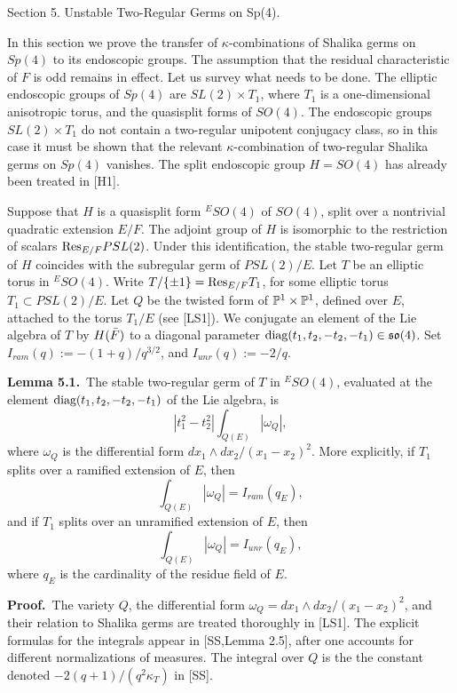 \vfill\break
\centerline{\headfont Section 5.  Unstable Two-Regular Germs on Sp(4).}
\bigskip

In this section we prove the transfer of $\kappa$-combinations
of Shalika germs on $Sp(4)$ to its endoscopic groups.
The assumption that the residual characteristic of $F$
is odd remains in effect.  Let
us survey what needs to be done.  The elliptic
endoscopic groups of $Sp(4)$ are $SL(2)\times T_1$, where
$T_1$ is a one-dimensional anisotropic torus, and the
quasisplit forms of $SO(4)$.  The endoscopic groups
$SL(2)\times T_1$ do not contain a two-regular unipotent
conjugacy class, so in this case it must be shown that
the relevant $\kappa$-combination of two-regular Shalika
germs on $Sp(4)$ vanishes.  The split endoscopic group
$H=SO(4)$ has already been treated in [H1].  

Suppose that
$H$ is a quasisplit form ${}^ESO(4)$ of $SO(4)$, split over
a nontrivial quadratic extension $E/F$.  The adjoint group
of $H$ is isomorphic to the restriction of scalars
$\hbox{Res}_{E/F}PSL(2)$.  Under this identification,
the stable two-regular germ
of $H$ coincides with the subregular germ of
$PSL(2)/E$.
Let $T$ be an elliptic torus in ${}^ESO(4)$.
Write $T/\{\pm1\} = \hbox{Res}_{E/F} T_1$, for some
elliptic torus $T_1\subset PSL(2)/E$.  Let $Q$ be the twisted form
of $\P^1\times \P^1$, defined over $E$, attached to the
torus $T_1/E$ (see [LS1]).  We conjugate an element of the
Lie algebra of $T$ by $H(\bF)$ to a diagonal parameter
$\diag(t_1,t_2,-t_2,-t_1)\in \so(4)$.
Set $I_{ram}(q):= -(1+q)/q^{3/2}$, and $I_{unr}(q):= -2/q$.

\bigskip
\noindent
{\bf Lemma 5.1.}\ The stable two-regular germ of $T$ in ${}^ESO(4)$,
evaluated at the element $\diag(t_1,t_2,-t_2,-t_1)$ of the
Lie algebra, is
$$|t_1^2-t_2^2| \int_{Q(E)} |\omega_Q|,$$
where $\omega_Q$ is the differential form $dx_1\wedge dx_2/(x_1-x_2)^2$.
More explicitly, if $T_1$ splits over a ramified
extension of $E$, then
$$\int_{Q(E)} |\omega_Q| = I_{ram}(q_E),$$
and if $T_1$ splits over an unramified extension of $E$, then
$$\int_{Q(E)} |\omega_Q| = I_{unr}(q_E),$$
where $q_E$ is the cardinality of the residue field of $E$.

\bigskip
\noindent
{\bf Proof.}\  The variety $Q$, the differential form $\omega_Q=
dx_1\wedge dx_2/(x_1-x_2)^2$, and their relation to Shalika germs
are treated thoroughly in [LS1].  The explicit formulas for the integrals
appear in [SS,Lemma 2.5], after one accounts for different
normalizations of measures.  The
integral over $Q$ is the the constant denoted
$-2 (q+1)/(q^2 \kappa_T)$  in [SS].
\hfill\x
\bigskip

